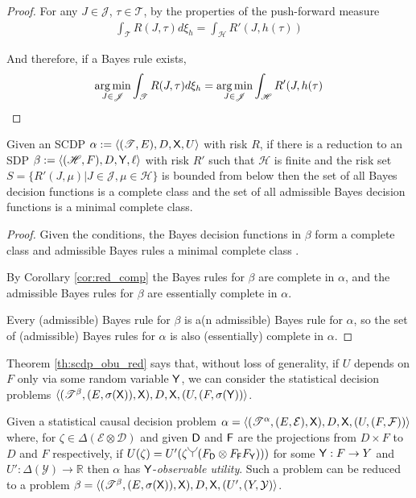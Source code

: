 \begin{proof}
For any $J\in\mathscr{J}$, $\tau\in \mathscr{T}$, by the properties of the push-forward measure
\begin{align}
    \int_{\mathscr{T}} R(J,\tau) d\xi_h = \int_\mathscr{H} R'(J,h(\tau))
\end{align}

And therefore, if a Bayes rule exists,
\begin{align}
    \operatorname*{arg\,min}_{J\in\mathscr{J}} \int_{\mathscr{T}} R(J,\tau) d\xi_h =  \operatorname*{arg\,min}_{J\in\mathscr{J}}\int_\mathscr{H} R'(J,h(\tau)
\end{align}

\end{proof}

\begin{theorem}\label{th:complete_class}
Given an SCDP $\alpha:=\langle (\mathscr{T},E),D,\mathsf{X},U\rangle$ with risk $R$, if there is a reduction to an SDP $\beta:=\langle (\mathscr{H},F),D,\mathsf{Y},\ell \rangle$ with risk $R'$ such that $\mathscr{H}$ is finite and the risk set $S=\{R'(J,\mu)|J\in\mathscr{J},\mu\in \mathscr{H}\}$ is bounded from below then the set of all Bayes decision functions is a complete class and the set of all admissible Bayes decision functions is a minimal complete class.
\end{theorem}

\begin{proof}
Given the conditions, the Bayes decision functions in $\beta$ form a complete class and admissible Bayes rules a minimal complete class \cite{toutenburg_ferguson_1970}.

By Corollary \ref{cor:red_comp} the Bayes rules for $\beta$ are complete in $\alpha$, and the admissible Bayes rules for $\beta$ are essentially complete in $\alpha$.

Every (admissible) Bayes rule for $\beta$ is a(n admissible) Bayes rule for $\alpha$, so the set of (admissible) Bayes rules for $\alpha$ is also (essentially) complete in $\alpha$.
\end{proof}


Theorem \ref{th:scdp_obu_red} says that, without loss of generality, if $U$ depends on $F$ only via some random variable $\mathsf{Y}$, we can consider the statistical decision problems $\langle (\mathscr{T}^\beta,(E,\sigma(\mathsf{X})),\mathsf{X}),D,\mathsf{X},(U,(F,\sigma(\mathsf{Y}))\rangle$.

\begin{theorem}\label{th:scdp_obu_red}
Given a statistical causal decision problem $\alpha=\langle (\mathscr{T}^\alpha,(E,\mathcal{E}),\mathsf{X}),D,\mathsf{X},(U,(F,\mathcal{F}))\rangle$ where, for $\zeta\in \Delta(\mathcal{E}\otimes\mathcal{D})$ and given $\mathsf{D}$ and $\mathsf{F}$ are the projections from $D\times F$ to $D$ and $F$ respectively, if $U(\zeta)=U'(\zeta\splitter{0.15}(F_\RV{D}\otimes F_{\RV{F}} F_{\RV{Y}}) ))$ for some $\mathsf{Y}: F\to Y$ and $U':\Delta(\mathcal{Y})\to \mathbb{R}$ then $\alpha$ has $\mathsf{Y}$-\emph{observable utility}. Such a problem can be reduced to a problem $\beta=\langle (\mathscr{T}^\beta,(E,\sigma(\mathsf{X})),\mathsf{X}),D,\mathsf{X},(U',(Y,\mathcal{Y})\rangle$.
\end{theorem}

